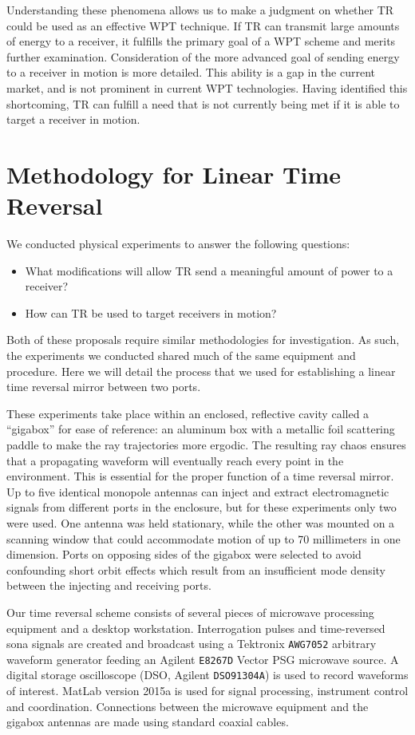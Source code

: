 Understanding these phenomena allows us to make a judgment on whether TR could be used as an effective WPT technique. If TR can transmit large amounts of energy to a receiver, it fulfills the primary goal of a WPT scheme and merits further examination. Consideration of the more advanced goal of sending energy to a receiver in motion is more detailed. This ability is a gap in the current market, and is not prominent in current WPT technologies. Having identified this shortcoming, TR can fulfill a need that is not currently being met if it is able to target a receiver in motion.

\section{Methodology for Linear Time Reversal}
\label{sec:ltr-meth}

We conducted physical experiments to answer the following questions:
\begin{itemize}
    \item What modifications will allow TR send a meaningful amount of power to a receiver?
    \item How can TR be used to target receivers in motion?
\end{itemize}
Both of these proposals require similar methodologies for investigation. As such, the experiments we conducted shared much of the same equipment and procedure. Here we will detail the process that we used for establishing a linear time reversal mirror between two ports.

These experiments take place within an enclosed, reflective cavity called a ``gigabox'' for ease of reference: an aluminum box with a metallic foil scattering paddle to make the ray trajectories more ergodic. The resulting ray chaos ensures that a propagating waveform will eventually reach every point in the environment. This is essential for the proper function of a time reversal mirror. Up to five identical monopole antennas can inject and extract electromagnetic signals from different ports in the enclosure, but for these experiments only two were used. One antenna was held stationary, while the other was mounted on a scanning window that could accommodate motion of up to 70 millimeters in one dimension. Ports on opposing sides of the gigabox were selected to avoid confounding short orbit effects which result from an insufficient mode density between the injecting and receiving ports.

Our time reversal scheme consists of several pieces of microwave processing equipment and a desktop workstation. Interrogation pulses and time-reversed sona signals are created and broadcast using a Tektronix \texttt{AWG7052} arbitrary waveform generator feeding an Agilent \texttt{E8267D} Vector PSG microwave source. A digital storage oscilloscope (DSO, Agilent \texttt{DSO91304A}) is used to record waveforms of interest. MatLab version 2015a is used for signal processing, instrument control and coordination. Connections between the microwave equipment and the gigabox antennas are made using standard coaxial cables.

